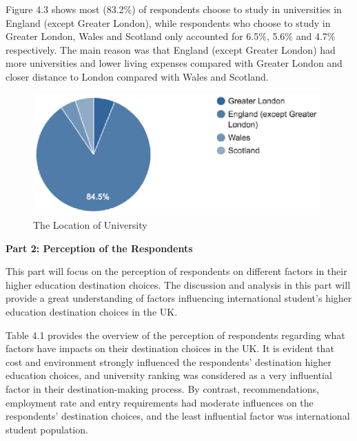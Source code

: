 Figure 4.3 shows most (83.2\%) of respondents choose to study in universities in England (except Greater London), while respondents who choose to study in Greater London, Wales and Scotland only accounted for 6.5\%, 5.6\% and 4.7\% respectively. The main reason was that England (except Greater London) had more universities and lower living expenses compared with Greater London and closer distance to London compared with Wales and Scotland. 

\begin{figure}[H]
  \centering
  \includegraphics[width=11cm]{./img/Picture6}
  \caption{The Location of University}
  \label{Figure:figex}
\end{figure}

\textbf{Part 2: Perception of the Respondents}

This part will focus on the perception of respondents on different factors in their higher education destination choices. The discussion and analysis in this part will provide a great understanding of factors influencing international student’s higher education destination choices in the UK.

Table 4.1 provides the overview of the perception of respondents regarding what factors have impacts on their destination choices in the UK. It is evident that cost and environment strongly influenced the respondents’ destination higher education choices, and university ranking was considered as a very influential factor in their destination-making process. By contrast, recommendations, employment rate and entry requirements had moderate influences on the respondents’ destination choices, and the least influential factor was international student population. 


